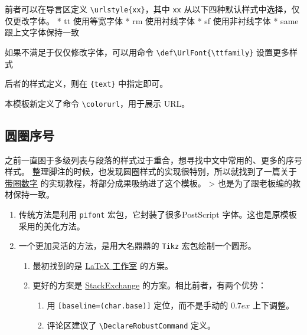 \documentclass[../Main/thesis.tex]{subfiles}
\begin{document}
前者可以在导言区定义 \texttt{\textbackslash{}urlstyle\{xx\}}，其中
\texttt{xx} 从以下四种默认样式中选择，仅仅更改字体。 * tt 使用等宽字体 *
rm 使用衬线字体 * sf 使用非衬线字体 * same 跟上文字体保持一致

如果不满足于仅仅修改字体，可以用命令
\texttt{\textbackslash{}def\textbackslash{}UrlFont\{\textbackslash{}ttfamily\}}
设置更多样式

后者的样式定义，则在 \texttt{\{text\}} 中指定即可。

本模板新定义了命令 \texttt{\textbackslash{}colorurl}，用于展示 URL。



\subsection{圆圈序号}

之前一直困于多级列表与段落的样式过于重合，想寻找中文中常用的、更多的序号样式。
整理脚注的时候，也发现圆圈样式的实现很特别，所以就找到了一篇关于
\href{https://stone-zeng.github.io/2019-02-09-circled-numbers/}{带圈数字}
的实现教程，将部分成果吸纳进了这个模板。 \textgreater{}
也是为了跟老板编的教材保持一致。

\begin{enumerate}
\def\labelenumi{\arabic{enumi}.}
\item
  传统方法是利用 \texttt{pifont} 宏包，它封装了很多PostScript
  字体。这也是原模板采用的美化方法。
\item
  一个更加灵活的方法，是用大名鼎鼎的 \texttt{Tikz} 宏包绘制一个圆形。

  \begin{enumerate}
  \def\labelenumii{\arabic{enumii}.}
  \item
    最初找到的是
    \href{https://www.latexstudio.net/archives/1571.html}{LaTeX 工作室}
    的方案。
  \item
    更好的方案是
    \href{https://tex.stackexchange.com/questions/7032/good-way-to-make-textcircled-numbers\#}{StackExchange}
    的方案。相比前者，有两个优势：

    \begin{enumerate}
    \def\labelenumiii{\arabic{enumiii}.}
    \item
      用 \texttt{{[}baseline=(char.base){]}} 定位，而不是手动的
      \(0.7ex\) 上下调整。
    \item
      评论区建议了 \texttt{\textbackslash{}DeclareRobustCommand} 定义。
    \end{enumerate}
  \end{enumerate}
\end{enumerate}
\end{document}
